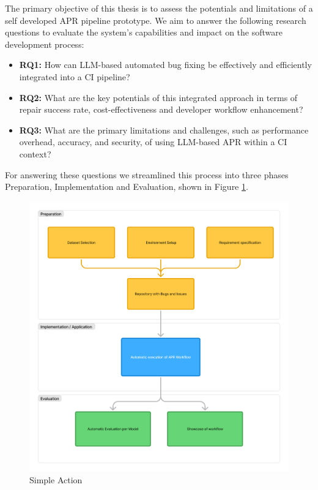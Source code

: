 The primary objective of this thesis is to assess the potentials and limitations of a self developed APR pipeline prototype. We aim to answer the following research questions to evaluate the system's capabilities and impact on the software development process:

\begin{itemize}
    \item \textbf{RQ1:} How can LLM-based automated bug fixing be effectively and efficiently integrated into a CI pipeline?
    \item \textbf{RQ2:} What are the key potentials of this integrated approach in terms of repair success rate, cost-effectiveness and developer workflow enhancement?
    \item \textbf{RQ3:} What are the primary limitations and challenges, such as performance overhead, accuracy, and security, of using LLM-based APR within a CI context?
\end{itemize}

For answering these questions we streamlined this process into three phases Preparation, Implementation and Evaluation, shown in Figure \ref{fig:method-overview}.

\begin{figure}[H]
    \centering
    \includegraphics[width=1\textwidth]{images/method.png}
    \caption{Simple Action}
    \label{fig:method-overview}
\end{figure}

